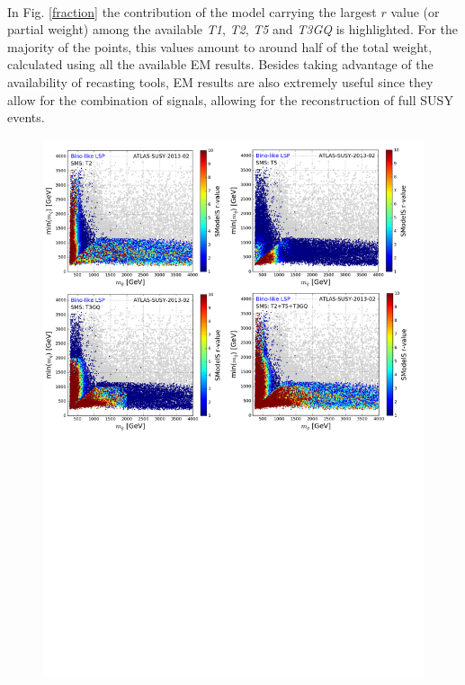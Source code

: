 \documentclass[epj,nopacs,fleqn]{svjour}
\begin{document}
\\
In Fig. \ref{fraction} the contribution of the model carrying the largest $r$ value (or partial weight) among the available \textit{T1}, \textit{T2}, \textit{T5} and \textit{T3GQ} is highlighted. For the majority of the points, this values amount to around half of the total weight, calculated using all the available EM results. Besides taking advantage of the availability of recasting tools, EM results are also extremely useful since they allow for the combination of signals, allowing for the reconstruction of full SUSY events. 

\begin{figure}[!]
	\begin{center}
		\includegraphics[width=1\textwidth]{PLOTS/App/Bino_Combo.pdf}
	\end{center}

\end{figure}
\end{document}
